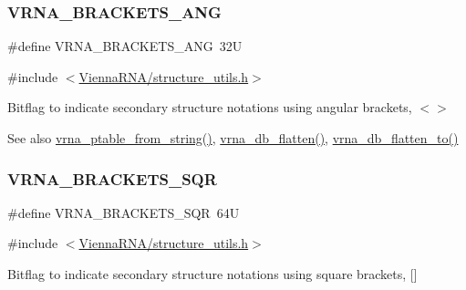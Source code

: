 \subsubsection{\texorpdfstring{V\+R\+N\+A\+\_\+\+B\+R\+A\+C\+K\+E\+T\+S\+\_\+\+A\+NG}{VRNA\_BRACKETS\_ANG}}
{\footnotesize\ttfamily \#define V\+R\+N\+A\+\_\+\+B\+R\+A\+C\+K\+E\+T\+S\+\_\+\+A\+NG~32U}



{\ttfamily \#include $<$\hyperlink{structure__utils_8h}{Vienna\+R\+N\+A/structure\+\_\+utils.\+h}$>$}



Bitflag to indicate secondary structure notations using angular brackets, {\ttfamily $<$$>$} 

\begin{DoxySeeAlso}{See also}
\hyperlink{group__struct__utils_gac76c9ef3de507748fb0416a59323362b}{vrna\+\_\+ptable\+\_\+from\+\_\+string()}, \hyperlink{group__struct__utils_gae966b9f44168a4f4b39ca42ffb5f37b7}{vrna\+\_\+db\+\_\+flatten()}, \hyperlink{group__struct__utils_ga690425199c8b71545e7196e3af1436f8}{vrna\+\_\+db\+\_\+flatten\+\_\+to()} 
\end{DoxySeeAlso}
\mbox{\label{group__struct__utils_ga60525d61d7496eeea490a37f3d6bf757}} 
\subsubsection{\texorpdfstring{V\+R\+N\+A\+\_\+\+B\+R\+A\+C\+K\+E\+T\+S\+\_\+\+S\+QR}{VRNA\_BRACKETS\_SQR}}
{\footnotesize\ttfamily \#define V\+R\+N\+A\+\_\+\+B\+R\+A\+C\+K\+E\+T\+S\+\_\+\+S\+QR~64U}



{\ttfamily \#include $<$\hyperlink{structure__utils_8h}{Vienna\+R\+N\+A/structure\+\_\+utils.\+h}$>$}



Bitflag to indicate secondary structure notations using square brackets, {\ttfamily \mbox{[}\mbox{]}} 

